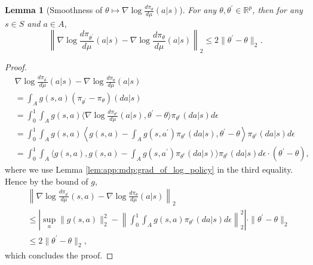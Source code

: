 \documentclass{amsart}
\newtheorem{lemma}[theorem]{Lemma}
\theoremstyle{definition}
\begin{document}
\begin{lemma}[Smoothness of $\theta \mapsto \nabla \log\frac{d \pi_{\theta}}{d \mu} (a|s)$]\label{lem: smooth of log policy}
For any $\theta, \theta^\prime \in \mathbb{R}^p$, then for any $s \in S$ and $a \in A$,        \begin{equation}\label{eq: smooth of log policy}
\left\|\nabla \log\frac{d \pi_{\theta^\prime}}{d \mu} (a|s) - \nabla \log\frac{d \pi_{\theta}}{d \mu} (a|s)\right\|_2 \leq 2\|\theta^\prime - \theta\|_2. 
\end{equation}
\end{lemma}
\begin{proof}
\begin{align*}
& \nabla \log\frac{d \pi_{\theta^\prime}}{d \mu} (a|s) - \nabla \log\frac{d \pi_{\theta}}{d \mu} (a|s) \\
& = \int_A g(s,a) \left(\pi_{\theta^\prime} - \pi_{\theta}\right)(da|s)\\
& =  \int_0^1 \int_A g(s,a) \bigg\langle\nabla \log\frac{d \pi_{\theta^\epsilon}}{d \mu} (a|s),\theta^\prime - \theta \bigg\rangle \pi_{\theta^\epsilon} (da|s)d \epsilon  \\
& = \int_0^1 \int_A g(s,a) \left\langle g(s, a) - \int_A g(s,a^\prime)\pi_{\theta^\epsilon} (da|s),\theta^\prime - \theta \right\rangle \pi_{\theta^\epsilon} (da|s)d \epsilon \\
& = \int_0^1 \int_A \langle g(s,a) , g(s,a) - \int_A g(s,a^\prime)\pi_{\theta^\epsilon} (da|s)\rangle \pi_{\theta^\epsilon} (da|s)d \epsilon \cdot (\theta^\prime - \theta),
\end{align*}
where we use Lemma \ref{lem:app:mdp:grad_of_log_policy} in the third equality.
Hence by the bound of $g$,
\begin{align*}
&\left\|\nabla \log\frac{d \pi_{\theta^\prime}}{d \mu} (s,a) - \nabla \log\frac{d \pi_{\theta}}{d \mu} (a|s)\right\|_2\\
&\leq \left|\sup_a \|g(s,a)\|^2_2 - \left\|\int_0^1 \int_A g(s,a)\pi_{\theta^\epsilon} (da|s)d \epsilon\right\|^2_2\right| \cdot \|\theta^\prime - \theta\|_2\\
& \leq 2\|\theta^\prime - \theta\|_2,
\end{align*}
which concludes the proof.
\end{proof}
\end{document}
